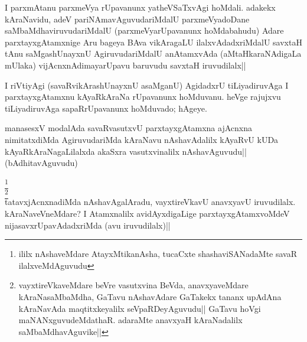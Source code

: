 
\begin{artha} 
I parxmAtanu parxmeVya rUpavanunx yatheVSaTxvAgi hoMdali. adakekx 
kAraNavidu, adeV pariNAmavAguvudariMdalU parxmeVyadoDane 
saMbaMdhaviruvudariMdalU (parxmeVyarUpavanunx hoMdabahudu) Adare 
parxtayxgAtamxnige Aru bageya BAva vikAragaLU ilalxvAdadxriMdalU 
savxtaH tAnu saMgashUnayxnU AgiruvudariMdalU anAtamxvAda 
(aMtaHkaraNAdigaLa mUlaka) vijAcnxnAdimayarUpavu baruvudu savxtaH 
iruvudilalx||
\end{artha}

\begin{artha} 
I riVtiyAgi (savaRvikArashUnayxnU asaMganU) AgidadxrU tiLiyadiruvAga I 
parxtayxgAtamxnu kAyaRkAraNa rUpavanunx hoMduvanu. heVge rajujxvu 
tiLiyadiruvAga sapaRrUpavanunx hoMduvado; hAgeye.  
\end{artha}


\begin{artha} 
manasesxV modalAda savaRvasutxvU parxtayxgAtamxna ajAcnxna 
nimitatxdiMda AgiruvudariMda kAraNavu nAshavAdalilx kAyaRvU kUDa 
kAyaRkAraNagaLilalxda akaSxra vasutxvinalilx nAshavAguvudu|| 
(bAdhitavAguvudu)
\end{artha}


\begin{artha} 
\footnote[1]{ililx nAshaveMdare AtayxMtikanAsha, 
tucaCxte shashaviSANadaMte savaR ilalxveMdAguvudu}\\
\footnote[2]{vayxtireVkaveMdare beVre vasutxvina BeVda, anavxyaveMdare 
kAraNasaMbaMdha, GaTavu nAshavAdare GaTakekx tananx upAdAna kAraNavAda 
maqtitxkeyalilx seVpaRDeyAguvudu|| GaTavu hoVgi maNANxguvudeMdathaR. 
adaraMte anavxyaH kAraNadalilx saMbaMdhavAguvike||}\\
tatavxjAcnxnadiMda nAshavAgalAradu, vayxtireVkavU anavxyavU 
iruvudilalx. kAraNaveVneMdare? I Atamxnalilx avidAyxdigaLige 
parxtayxgAtamxvoMdeV nijasavxrUpavAdadxriMda (avu iruvudilalx)||
\end{artha}

